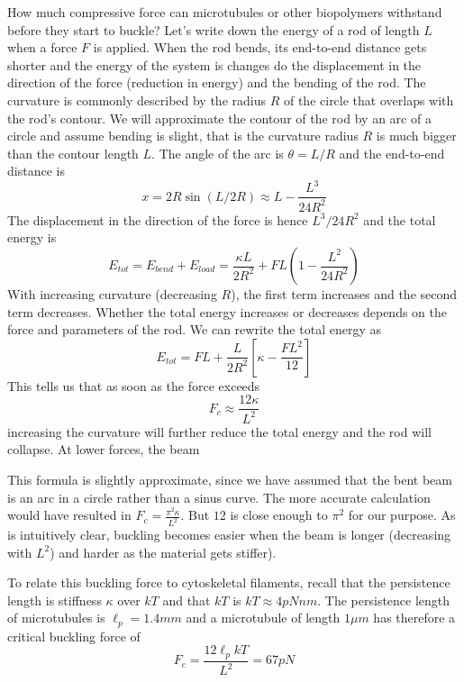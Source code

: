 How much compressive force can microtubules or other biopolymers withstand before they start to buckle?
Let's write down the energy of a rod of length $L$ when a force $F$ is applied.
When the rod bends, its end-to-end distance gets shorter and the energy of the system is changes do the displacement in the direction of the force (reduction in energy) and the bending of the rod.
The curvature is commonly described by the radius $R$ of the circle that overlaps with the rod's contour.
We will approximate the contour of the rod by an arc of a circle and assume bending is slight, that is the curvature radius $R$ is much bigger than the contour length $L$.
The angle of the arc is $\theta = L/R$ and the end-to-end distance is
\begin{equation}
 x = 2R\sin(L/2R) \approx L - \frac{L^3}{24R^2}
\end{equation}
The displacement in the direction of the force is hence $L^3/24R^2$ and the total energy is
\begin{equation}
E_{tot} = E_{bend} + E_{load} = \frac{\kappa L}{2R^2} + FL(1 - \frac{L^2}{24R^2})
\end{equation}
With increasing curvature (decreasing $R$), the first term increases and the second term decreases.
Whether the total energy increases or decreases depends on the force and parameters of the rod.
We can rewrite the total energy as
\begin{equation}
	E_{tot} = FL + \frac{L}{2R^2}\left[\kappa -\frac{FL^2}{12}\right]
\end{equation}
This tells us that as soon as the force exceeds
\begin{equation}
F_c \approx \frac{12\kappa}{L^2}
\end{equation}
increasing the curvature will further reduce the total energy and the rod will collapse.
At lower forces, the beam

This formula is slightly approximate, since we have assumed that the bent beam is an arc in a circle rather than a sinus curve.
The more accurate calculation would have resulted in $F_c = \frac{\pi^2\kappa}{L^2}$.
But $12$ is close enough to $\pi^2$ for our purpose.
As is intuitively clear, buckling becomes easier when the beam is longer (decreasing with $L^2$) and harder as the material gets stiffer).

To relate this buckling force to cytoskeletal filaments, recall that the persistence length is stiffness $\kappa$ over $kT$ and that $kT$ is $kT\approx 4pN nm$.
The persistence length of microtubules is $\ell_p = 1.4mm$ and a microtubule of length $1\mu m$ has therefore a critical buckling force of
\begin{equation}
	F_c = \frac{12 \ell_p kT}{L^2} = 67 pN
\end{equation}



